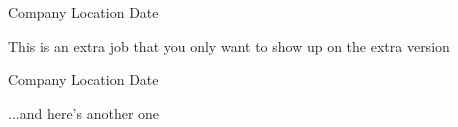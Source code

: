  {Company} {Location} {Date}
\begin{entryitems}
    \item{This is an extra job that you only want to show up on the extra version}
\end{entryitems}
 {Company} {Location} {Date}
\begin{entryitems}
\item{...and here's another one}
\end{entryitems}
